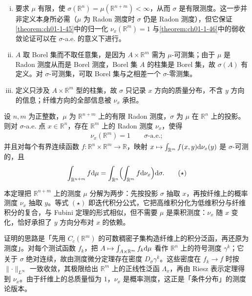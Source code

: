 \documentclass[../../main.tex]{subfiles}%
\begin{document}
\begin{remark}\label{remark:ch01-def-1-33-条件}
\begin{enumerate}[(i)]
\item 要求 $\mu$ 有限，使 $\sigma(\mathbb{R}^n)=\mu(\mathbb{R}^{n+m})<\infty$，从而 $\sigma$ 是有限测度。这一步并非定义本身所必需（$\mu$ 为 Radon 测度时 $\sigma$ 仍是 Radon 测度），但它保证\cref{theorem:ch01-1-45}中的归一化 $\nu_x(\mathbb{R}^m)=1$ 与\cref{theorem:ch01-1-46}中的弱收敛论证可以在 $\sigma$-a.e. 的意义下进行。%
\item $A$ 取 Borel 集而不取任意集，是因为 $A\times\mathbb{R}^m$ 需为 $\mu$-可测集；由于 $\mu$ 是 Radon 测度从而是 Borel 测度，Borel 集 $A$ 的柱集是 Borel 集，故 $\sigma(A)$ 有定义。对 $\sigma$-可测集，可取 Borel 集与之相差一个 $\sigma$-零测集。
\item 定义只涉及 $A\times\mathbb{R}^m$ 型的柱集，故 $\sigma$ 只记录 $x$ 方向的质量分布，不含 $y$ 方向的信息；纤维方向的全部信息被 $\nu_x$ 承担。
\end{enumerate}
\end{remark}

\begin{theorem}[切片测度]\label{theorem:ch01-1-45}
设 $n,m$ 为正整数，$\mu$ 为 $\mathbb{R}^{n+m}$ 上的有限 Radon 测度，$\sigma$ 为 $\mu$ 在 $\mathbb{R}^n$ 上的投影。则对 $\sigma$-a.e. 点 $x\in\mathbb{R}^n$，存在 $\mathbb{R}^m$ 上的 Radon 测度 $\nu_x$，使得
\begin{align*}
\nu_x(\mathbb{R}^m)=1\qquad\sigma\text{-a.e.};
\end{align*}
并且对每个有界连续函数 $f:\mathbb{R}^n\times\mathbb{R}^m\to\mathbb{R}$，映射 $x\mapsto\int_{\mathbb{R}^m}f(x,y)\mathrm{d}\nu_x(y)$ 是 $\sigma$-可测的，且
\begin{align*}
\int_{\mathbb{R}^{n+m}}f\mathrm{d}\mu=\int_{\mathbb{R}^n}\Bigl(\int_{\mathbb{R}^m}f\mathrm{d}\nu_x\Bigr)\mathrm{d}\sigma .\qquad(\star)
\end{align*}
\end{theorem}

\begin{remark}\label{remark:ch01-thm-1-45-动机}
本定理把 $\mathbb{R}^{n+m}$ 上的测度 $\mu$ 分解为两步：先按投影 $\sigma$ 抽取 $x$，再按纤维上的概率测度 $\nu_x$ 抽取 $y$。等式 $(\star)$ 即迭代积分公式，它把高维积分化为低维积分与纤维积分的复合，与 Fubini 定理的形式相似，但不需要 $\mu$ 是乘积测度：$\nu_x$ 随 $x$ 变化，恰好承担了 $y$ 方向分布对 $x$ 的依赖。

证明的思路是「先用 $C_c(\mathbb{R}^m)$ 的可数稠密子集构造纤维上的积分泛函，再还原为测度」。对每个测试函数 $f_k$，把 $A\mapsto\int_{A\times\mathbb{R}^m}f_k\mathrm{d}\mu$ 看作 $\mathbb{R}^n$ 上的符号测度 $\gamma^k$；它关于 $\sigma$ 绝对连续，故由测度微分定理存在密度 $D_\sigma\gamma^k$。这些密度在 $f_k\to f$ 时按 $\lVert\cdot\rVert_{L^\infty}$ 一致收敛，其极限给出 $\mathbb{R}^m$ 上的正线性泛函 $\Lambda_x$，再由 Riesz 表示定理得到 $\nu_x$。由于纤维上的总质量恒为 $1$，$\nu_x$ 是概率测度，这正是「条件分布」的测度论版本。%
\end{remark}
\end{document}
